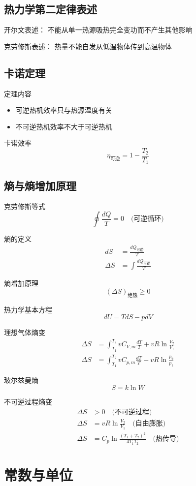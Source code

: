 \documentclass[12pt]{article}
\begin{document}
\subsection{热力学第二定律表述}
开尔文表述：
不能从单一热源吸热完全变功而不产生其他影响

克劳修斯表述：
热量不能自发从低温物体传到高温物体

\subsection{卡诺定理}
定理内容
\begin{itemize}
    \item 可逆热机效率只与热源温度有关
    \item 不可逆热机效率不大于可逆热机
\end{itemize}

卡诺效率
\[
\eta_{\text{可逆}} = 1 - \frac{T_2}{T_1}
\]

\subsection{熵与熵增加原理}
克劳修斯等式
\[
\oint \frac{dQ}{T} = 0 \quad \text{(可逆循环)}
\]

熵的定义
\begin{align*}
    dS &= \frac{dQ_{\text{可逆}}}{T} \\
    \Delta S &= \int \frac{dQ_{\text{可逆}}}{T}
\end{align*}

熵增加原理
\[
(\Delta S)_{\text{绝热}} \geq 0
\]

热力学基本方程
\[
dU = TdS - pdV
\]

理想气体熵变
\begin{align*}
    \Delta S &= \int_{T_1}^{T_2} vC_{V,m}\frac{dT}{T} + vR\ln\frac{V_2}{V_1} \\
    \Delta S &= \int_{T_1}^{T_2} vC_{p,m}\frac{dT}{T} - vR\ln\frac{p_2}{p_1}
\end{align*}

玻尔兹曼熵
\[
S = k\ln W
\]

不可逆过程熵变
\begin{align*}
    \Delta S &> 0 \quad \text{(不可逆过程)} \\
    \Delta S &= vR\ln\frac{V_2}{V_1} \quad \text{(自由膨胀)} \\
    \Delta S &= C_p\ln\frac{(T_1 + T_2)^2}{4T_1T_2} \quad \text{(热传导)}
\end{align*}

\section{常数与单位}
\end{document}
